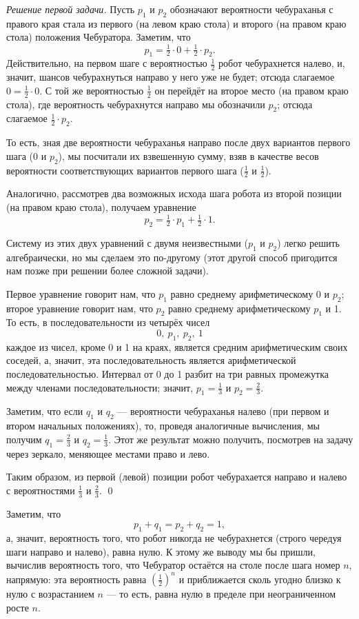 \documentclass{article}
\begin{document}
\medskip
\noindent\textit{Решение первой задачи.}
Пусть $p_1$ и $p_2$ обозначают вероятности чебураханья с правого края стала из первого (на левом краю стола) и второго (на правом краю стола) положения Чебуратора.
Заметим, что
\[p_1=\tfrac12\cdot0+\tfrac12\cdot p_2.\]
Действительно, на первом шаге с вероятностью $\tfrac12$ робот чебурахнется налево,
и, значит, шансов чебурахнуться направо у него уже не будет; 
отсюда слагаемое $0=\tfrac12\cdot0$. С той же вероятностью $\tfrac12$ он перейдёт на второе место (на правом краю стола), где вероятность чебурахнутся направо мы обозначили $p_2$; отсюда слагаемое $\tfrac12\cdot p_2$. 

То есть, зная две вероятности чебураханья направо после двух вариантов первого шага (0 и $p_2$), мы посчитали их взвешенную сумму, взяв в качестве весов вероятности соответствующих вариантов первого шага ($\tfrac12$ и $\tfrac12$).

Аналогично, рассмотрев два возможных исхода шага робота из второй позиции (на правом краю стола), получаем уравнение 
\[p_2=\tfrac12\cdot p_1+\tfrac12\cdot 1.\]

Систему из этих двух уравнений с двумя неизвестными ($p_1$ и $p_2$) легко решить алгебраически, но мы сделаем это по-другому (этот другой способ пригодится нам позже при решении более сложной задачи). 

Первое уравнение говорит нам, что $p_1$ равно среднему арифметическому 0 и $p_2$; второе уравнение говорит нам, что $p_2$ равно среднему арифметическому $p_1$ и 1. То есть, в последовательности из четырёх чисел
\[0,\  p_1,\  p_2,\ 1\]
каждое из чисел, кроме 0 и 1 на краях, является средним арифметическим своих соседей, а, значит, эта последовательность является арифметической последовательностью. Интервал от 0 до 1 разбит на три равных промежутка между членами последовательности; значит, $p_1=\tfrac13$ и $p_2=\tfrac23$.

Заметим, что если $q_1$ и $q_2$ --- вероятности чебураханья налево (при первом и втором начальных положениях), 
то, проведя аналогичные вычисления, мы получим $q_1=\tfrac23$ и $q_2=\tfrac13$.
Этот же результат можно получить, посмотрев на задачу через зеркало, меняющее местами право и лево.

Таким образом, из первой (левой) позиции робот чебурахается направо и налево с вероятностями $\tfrac13$ и $\tfrac23$.
\qed
\medskip

Заметим, что 
\[p_1+q_1=p_2+q_2=1,\]
а, значит, вероятность того, что робот никогда не чебурахнется (строго чередуя шаги направо и налево), равна нулю. 
К этому же выводу мы бы пришли, вычислив вероятность того, что Чебуратор остаётся на столе после шага номер $n$, напрямую: эта вероятность равна $(\tfrac12)^n$ и приближается сколь угодно близко к нулю с возрастанием $n$ --- то есть, равна нулю в пределе при неограниченном росте $n$.
\medskip
\end{document}

